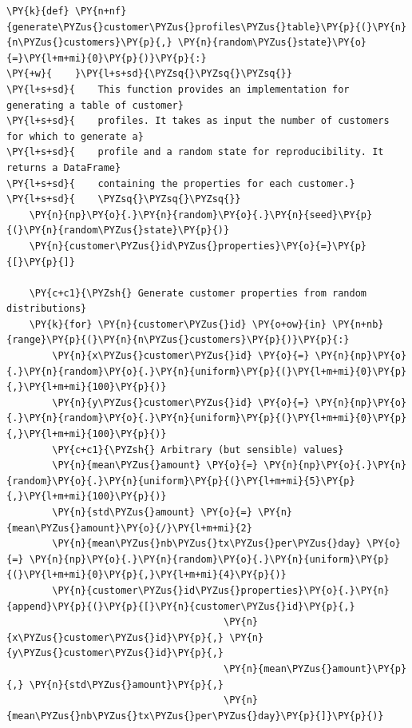     \begin{tcolorbox}[breakable, size=fbox, boxrule=1pt, pad at break*=1mm,colback=cellbackground, colframe=cellborder]
\begin{Verbatim}[commandchars=\\\{\}]
\PY{k}{def} \PY{n+nf}{generate\PYZus{}customer\PYZus{}profiles\PYZus{}table}\PY{p}{(}\PY{n}{n\PYZus{}customers}\PY{p}{,} \PY{n}{random\PYZus{}state}\PY{o}{=}\PY{l+m+mi}{0}\PY{p}{)}\PY{p}{:}
\PY{+w}{    }\PY{l+s+sd}{\PYZsq{}\PYZsq{}\PYZsq{}}
\PY{l+s+sd}{    This function provides an implementation for generating a table of customer}
\PY{l+s+sd}{    profiles. It takes as input the number of customers for which to generate a}
\PY{l+s+sd}{    profile and a random state for reproducibility. It returns a DataFrame}
\PY{l+s+sd}{    containing the properties for each customer.}
\PY{l+s+sd}{    \PYZsq{}\PYZsq{}\PYZsq{}}
    \PY{n}{np}\PY{o}{.}\PY{n}{random}\PY{o}{.}\PY{n}{seed}\PY{p}{(}\PY{n}{random\PYZus{}state}\PY{p}{)}
    \PY{n}{customer\PYZus{}id\PYZus{}properties}\PY{o}{=}\PY{p}{[}\PY{p}{]}

    \PY{c+c1}{\PYZsh{} Generate customer properties from random distributions}
    \PY{k}{for} \PY{n}{customer\PYZus{}id} \PY{o+ow}{in} \PY{n+nb}{range}\PY{p}{(}\PY{n}{n\PYZus{}customers}\PY{p}{)}\PY{p}{:}
        \PY{n}{x\PYZus{}customer\PYZus{}id} \PY{o}{=} \PY{n}{np}\PY{o}{.}\PY{n}{random}\PY{o}{.}\PY{n}{uniform}\PY{p}{(}\PY{l+m+mi}{0}\PY{p}{,}\PY{l+m+mi}{100}\PY{p}{)}
        \PY{n}{y\PYZus{}customer\PYZus{}id} \PY{o}{=} \PY{n}{np}\PY{o}{.}\PY{n}{random}\PY{o}{.}\PY{n}{uniform}\PY{p}{(}\PY{l+m+mi}{0}\PY{p}{,}\PY{l+m+mi}{100}\PY{p}{)}
        \PY{c+c1}{\PYZsh{} Arbitrary (but sensible) values}
        \PY{n}{mean\PYZus{}amount} \PY{o}{=} \PY{n}{np}\PY{o}{.}\PY{n}{random}\PY{o}{.}\PY{n}{uniform}\PY{p}{(}\PY{l+m+mi}{5}\PY{p}{,}\PY{l+m+mi}{100}\PY{p}{)}
        \PY{n}{std\PYZus{}amount} \PY{o}{=} \PY{n}{mean\PYZus{}amount}\PY{o}{/}\PY{l+m+mi}{2}
        \PY{n}{mean\PYZus{}nb\PYZus{}tx\PYZus{}per\PYZus{}day} \PY{o}{=} \PY{n}{np}\PY{o}{.}\PY{n}{random}\PY{o}{.}\PY{n}{uniform}\PY{p}{(}\PY{l+m+mi}{0}\PY{p}{,}\PY{l+m+mi}{4}\PY{p}{)}
        \PY{n}{customer\PYZus{}id\PYZus{}properties}\PY{o}{.}\PY{n}{append}\PY{p}{(}\PY{p}{[}\PY{n}{customer\PYZus{}id}\PY{p}{,}
                                      \PY{n}{x\PYZus{}customer\PYZus{}id}\PY{p}{,} \PY{n}{y\PYZus{}customer\PYZus{}id}\PY{p}{,}
                                      \PY{n}{mean\PYZus{}amount}\PY{p}{,} \PY{n}{std\PYZus{}amount}\PY{p}{,}
                                      \PY{n}{mean\PYZus{}nb\PYZus{}tx\PYZus{}per\PYZus{}day}\PY{p}{]}\PY{p}{)}


\end{Verbatim}
\end{tcolorbox}
